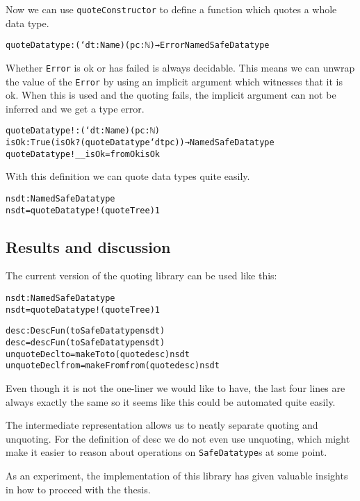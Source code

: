 Now we can use \texttt{quoteConstructor} to define a function which quotes
a whole data type.

\begin{alltt}
quoteDatatype : (`dt : Name)(pc : ℕ) → Error NamedSafeDatatype
\end{alltt}

Whether \texttt{Error} is ok or has failed is always decidable.
This means we can unwrap the value of the \texttt{Error} by using an
implicit argument which witnesses that it is ok.
When this is used and the quoting fails, the implicit argument can not
be inferred and we get a type error.

\begin{alltt}
quoteDatatype! : (`dt : Name) (pc : ℕ)
  {isOk : True (isOk? (quoteDatatype `dt pc))} → NamedSafeDatatype
quoteDatatype! _ _ {isOk} = fromOk isOk
\end{alltt}

With this definition we can quote data types quite easily.

\begin{alltt}
nsdt : NamedSafeDatatype
nsdt = quoteDatatype! (quote Tree) 1
\end{alltt}

\subsection{Results and discussion}\label{sec:prototype-results}

The current version of the quoting library can be used like this:

\begin{alltt}
nsdt : NamedSafeDatatype
nsdt = quoteDatatype! (quote Tree) 1

desc : DescFun (toSafeDatatype nsdt)
desc = descFun (toSafeDatatype nsdt)
unquoteDecl to = makeTo to (quote desc) nsdt
unquoteDecl from = makeFrom from (quote desc) nsdt
\end{alltt}

Even though it is not the one-liner we would like to have, the last
four lines are always exactly the same so it seems like this could be
automated quite easily.

The intermediate representation allows us to neatly separate quoting
and unquoting.
For the definition of desc we do not even use unquoting, which might
make it easier to reason about operations on \texttt{SafeDatatype}s at
some point. 


As an experiment, the implementation of this library has given
valuable insights in how to proceed with the thesis.
